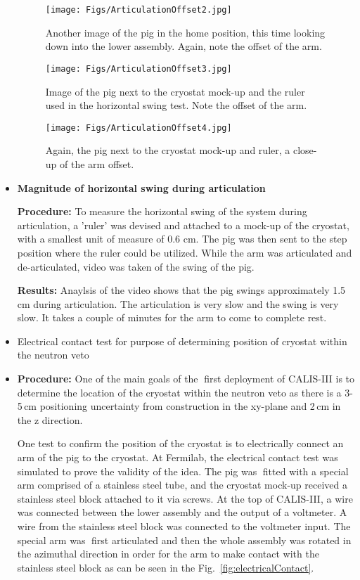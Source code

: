 \begin{itemize}
\begin{figure}[htbp]
 \centering
 \texttt{[image: Figs/ArticulationOffset2.jpg]}
 \caption{Another image of the pig in the home position, this time looking down into the lower assembly. Again, note the offset of the arm.}
 \label{fig:art_offset2}
\end{figure}

\begin{figure}[htbp]
 \centering
 \texttt{[image: Figs/ArticulationOffset3.jpg]}
 \caption{Image of the pig next to the cryostat mock-up and the ruler used in the horizontal swing test. Note the offset of the arm.}
 \label{fig:art_offset3}
\end{figure}

\begin{figure}[htbp]
 \centering
 \texttt{[image: Figs/ArticulationOffset4.jpg]}
 \caption{Again, the pig next to the cryostat mock-up and ruler, a close-up of the arm offset.}
 \label{fig:art_offset4}
\end{figure}

\item{\bf Magnitude of horizontal swing during articulation}

{\bf Procedure:} To measure the horizontal swing of the system during articulation, a 'ruler' was devised and
attached to a mock-up of the cryostat, with a smallest unit of measure of 0.6 cm. The pig was then sent to
the step position where the ruler could be utilized. While the arm was articulated and de-articulated, video
was taken of the swing of the pig.

{\bf Results:}  Anaylsis of the video shows that the pig swings approximately 1.5\,cm during articulation. The articulation is very slow and the swing is very slow. It takes a couple of minutes for the arm to come to complete rest.
    
 \item{Electrical contact test for purpose of determining position of cryostat within the neutron veto}
  
\item{\bf Procedure:} One of the main goals of the first deployment of CALIS-III is to determine the location of the cryostat within the neutron veto as there is a 3-5\,cm positioning uncertainty from construction in the xy-plane and 2\,cm in the z direction.

One test to confirm the position of the cryostat is to electrically connect an arm of the pig to the cryostat. At Fermilab, the electrical contact test was simulated to prove the validity of the idea. The pig was fitted
with a special arm comprised of a stainless steel tube, and the cryostat mock-up received a stainless steel
block attached to it via screws. At the top of CALIS-III, a wire was connected between the lower assembly
and the output of a voltmeter. A wire from the stainless steel block was connected to the voltmeter input. The special arm was first articulated and then the whole assembly was rotated in the azimuthal direction in
order for the arm to make contact with the stainless steel block as can be seen in the Fig.~\ref{fig:electricalContact}.


\end{itemize}

